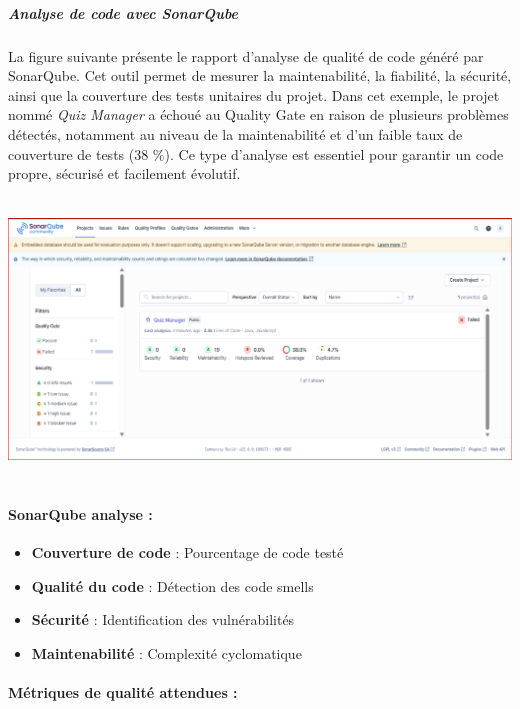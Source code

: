 \documentclass[12pt,a4paper,twoside]{report}
\begin{document}
\hypertarget{analyse-de-code-avec-sonarqube}{%
\subparagraph{Analyse de code avec
SonarQube}\label{analyse-de-code-avec-sonarqube}}

La figure suivante présente le rapport d'analyse de qualité de code
généré par SonarQube. Cet outil permet de mesurer la maintenabilité, la
fiabilité, la sécurité, ainsi que la couverture des tests unitaires du
projet. Dans cet exemple, le projet nommé \emph{Quiz Manager} a échoué
au Quality Gate en raison de plusieurs problèmes détectés, notamment au
niveau de la maintenabilité et d'un faible taux de couverture de tests
(38 \%). Ce type d'analyse est essentiel pour garantir un code propre,
sécurisé et facilement évolutif.

\includegraphics[width=6.15694in,height=2.94861in]{latex_media/media/image43.png}

\hypertarget{sonarqube-analyse}{%
\paragraph{SonarQube analyse :}\label{sonarqube-analyse}}

\begin{itemize}
\item
  \textbf{Couverture de code} : Pourcentage de code testé
\item
  \textbf{Qualité du code} : Détection des code smells
\item
  \textbf{Sécurité} : Identification des vulnérabilités
\item
  \textbf{Maintenabilité} : Complexité cyclomatique
\end{itemize}

\hypertarget{muxe9triques-de-qualituxe9-attendues}{%
\paragraph{Métriques de qualité attendues
:}\label{muxe9triques-de-qualituxe9-attendues}}
\end{document}
